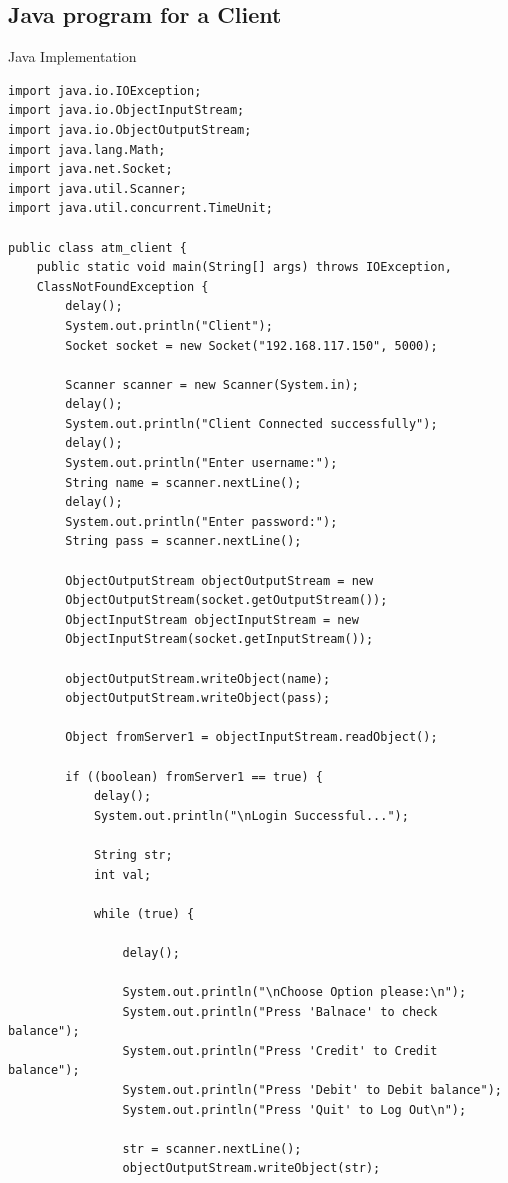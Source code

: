 \documentclass[11pt]{article}
\begin{document}
\subsection{Java program for a Client}
Java Implementation \\[2pt]
\begin{verbatim}
import java.io.IOException;
import java.io.ObjectInputStream;
import java.io.ObjectOutputStream;
import java.lang.Math;
import java.net.Socket;
import java.util.Scanner;
import java.util.concurrent.TimeUnit;

public class atm_client {
    public static void main(String[] args) throws IOException, 
    ClassNotFoundException {
        delay();
        System.out.println("Client");
        Socket socket = new Socket("192.168.117.150", 5000);

        Scanner scanner = new Scanner(System.in);
        delay();
        System.out.println("Client Connected successfully");
        delay();
        System.out.println("Enter username:");
        String name = scanner.nextLine();
        delay();
        System.out.println("Enter password:");
        String pass = scanner.nextLine();

        ObjectOutputStream objectOutputStream = new 
        ObjectOutputStream(socket.getOutputStream());
        ObjectInputStream objectInputStream = new 
        ObjectInputStream(socket.getInputStream());

        objectOutputStream.writeObject(name);
        objectOutputStream.writeObject(pass);

        Object fromServer1 = objectInputStream.readObject();

        if ((boolean) fromServer1 == true) {
            delay();
            System.out.println("\nLogin Successful...");

            String str;
            int val;

            while (true) {

                delay();

                System.out.println("\nChoose Option please:\n");
                System.out.println("Press 'Balnace' to check balance");
                System.out.println("Press 'Credit' to Credit balance");
                System.out.println("Press 'Debit' to Debit balance");
                System.out.println("Press 'Quit' to Log Out\n");

                str = scanner.nextLine();
                objectOutputStream.writeObject(str);


\end{verbatim}
\end{document}
